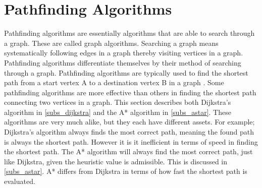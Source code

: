 \section{Pathfinding Algorithms}


Pathfinding algorithms are essentially algorithms that are able to search through a graph. These are called graph algorithms. Searching a graph means systematically following edges in a graph thereby visiting vertices in a graph. Pathfinding algorithms differentiate themselves by their method of searching through a graph. Pathfinding algorithms are typically used to find the shortest path from a start vertex A to a destination vertex B in a graph \cite{Cormen2009}.  Some pathfinding algorithms are more effective than others in finding the shortest path connecting two vertices in a graph. This section describes both Dijkstra's algorithm in \cref{subs_dijkstra} and the A* algorithm in \cref{subs_astar}. These algorithms are very much alike, but they each have different assets. For example; Dijkstra's algorithm always finds the most correct path, meaning the found path is always the shortest path. However it is it inefficient in terms of speed in finding the shortest path. The A* algorithm will always find the most correct path, just like Dijkstra, given the heuristic value is admissible. This is discussed in \cref{subs_astar}. A* differs from Dijkstra in terms of how fast the shortest path is evaluated.



